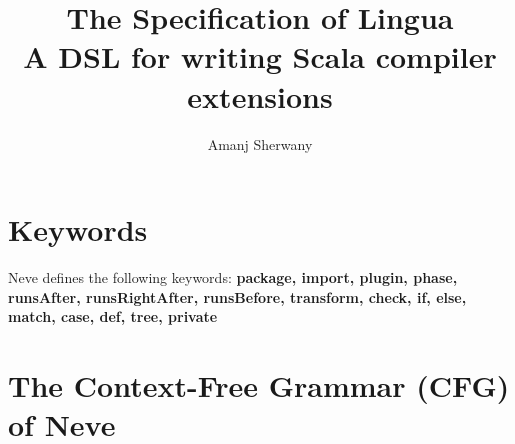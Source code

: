 \documentclass[12pt]{article}
\newcommand{\dsl}{Neve\xspace}
\renewcommand\c[1]{\text{#1}}
\begin{document}
\title{The Specification of Lingua\\
  \large{A DSL for writing Scala compiler extensions}}
\author{Amanj Sherwany}
  
  
  
\maketitle
\section{Keywords}

\dsl defines the following keywords: \textbf{package, import, plugin, phase,
runsAfter, runsRightAfter, runsBefore, transform, check, if, else, match,
case, def, tree, private}


\section{The Context-Free Grammar (CFG) of \dsl}
\end{document}
